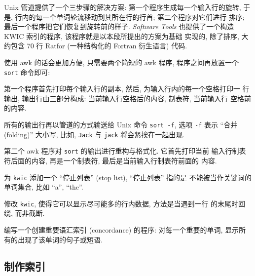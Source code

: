 Unix 管道提供了一个三步骤的解决方案: 第一个程序生成每一个输入行的旋转,
于是, 行内的每一个单词轮流移动到其所在行的行首; 第二个程序对它们进行
排序; 最后一个程序把它们恢复到旋转前的样子. \textit{Software Tools}
也提供了一个构造 KWIC 索引的程序, 该程序就是以本段所提出的方案为基础
实现的, 除了排序, 大约包含 70 行 Ratfor (一种结构化的 Fortran 衍生语言)
代码.

使用 awk 的话会更加方便, 只需要两个简短的 awk 程序, 程序之间再放置一个
\texttt{sort} 命令即可:
第一个程序首先打印每个输入行的副本, 然后, 为输入行内的每一个空格打印一
行输出, 输出行由三部分构成: 当前输入行空格后的内容, 制表符, 当前输入行%
%
空格前的内容.

所有的输出行再以管道的方式输送给 Unix 命令 \texttt{sort -f}, 选项
\texttt{-f} 表示 ``合并 (folding)'' 大小写, 比如, \texttt{Jack} 与 
\texttt{jack} 将会紧挨在一起出现.

第二个 awk 程序对 \texttt{sort} 的输出进行重构与格式化. 它首先打印当前
输入行制表符后面的内容, 再是一个制表符, 最后是当前输入行制表符前面的
内容.

\begin{exercise}
    \label{exer:stop_list}
    为 \texttt{kwic} 添加一个 ``停止列表'' (stop list), ``停止列表'' 指的是
    不能被当作关键词的单词集合, 比如 ``a'', ``the''.
\end{exercise}

\begin{exercise}
    修改 \texttt{kwic}, 使得它可以显示尽可能多的行内数据, 方法是当遇到一行
    的末尾时回绕, 而非截断.
\end{exercise}

\begin{exercise}
    编写一个创建重要语汇索引 (concordance) 的程序: 对每一个重要的单词,
    显示所有的出现了该单词的句子或短语.
\end{exercise}

\subsection{制作索引}
\label{subsec:making_indexes}

